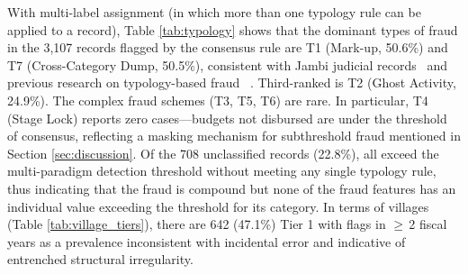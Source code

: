 \documentclass[3p,times,procedia]{elsarticle}
\begin{document}
With multi-label assignment (in which more than one typology rule can be applied to a record), Table \ref{tab:typology} shows that the dominant types of fraud in the 3,107 records flagged by the consensus rule are T1 (Mark-up, 50.6\%) and T7 (Cross-Category Dump, 50.5\%), consistent with Jambi judicial records~\cite{ref15,ref16,ref17,ref18} and previous research on typology-based fraud ~\cite{ref13, ref14}. Third-ranked is T2 (Ghost Activity, 24.9\%). The complex fraud schemes (T3, T5, T6) are rare. In particular, T4 (Stage Lock) reports zero cases—budgets not disbursed are under the threshold of consensus, reflecting a masking mechanism for subthreshold fraud mentioned in Section \ref{sec:discussion}. Of the 708 unclassified records (22.8\%), all exceed the multi-paradigm detection threshold without meeting any single typology rule, thus indicating that the fraud is compound but none of the fraud features has an individual value exceeding the threshold for its category. In terms of villages (Table \ref{tab:village_tiers}), there are 642 (47.1\%) Tier 1 with flags in $\geq$\,2 fiscal years as a prevalence inconsistent with incidental error and indicative of entrenched structural irregularity.
\end{document}
